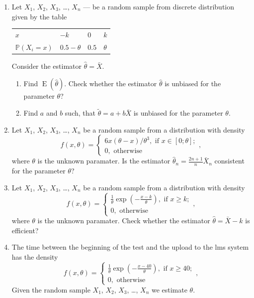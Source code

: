 \documentclass[12pt]{article}
\DeclareMathOperator{\E}{E}
\def \P{\mathbb{P}}
\begin{document}
\begin{enumerate}

\item  Let $X_1$, $X_2$, $X_3$, \ldots, $X_n$ — be a random sample from 
discrete distribution given by the table

\begin{tabular}{@{}llll@{}}
  \toprule
   $x$           & $-k$ & $0$ & $k$ \\ 
   $\P(X_i = x)$ & $0.5-\theta$ & $0.5$ & $\theta$ \\
  \bottomrule
\end{tabular}
			
Consider the estimator $\hat \theta = \bar X$.
\begin{enumerate}
  \item Find $\E(\hat \theta)$. 
  Check whether the estimator $\hat \theta$ is unbiased for the parameter $\theta$?
  \item Find $a$ and $b$ such, 
  that $\tilde \theta = a + b\bar X$ is unbiased for the parameter $\theta$.
  \end{enumerate} 
  

\item Let $X_1$, $X_2$, $X_3$, \ldots, $X_n$ 
 be a random sample from a distribution with density
\[
f(x, \theta) = \begin{cases}
  6x(\theta - x)/\theta^3, \text{ if } x\in [0;\theta]; \\
  0, \text{ otherwise}
\end{cases},
\]
where $\theta$  is the unknown paramater. 
Is the estimator $\hat\theta_n = \frac{2n+1}{n}\bar X_n$ consistent for the parameter $\theta$?

\item Let $X_1$, $X_2$, $X_3$, \ldots, $X_n$  be a random sample from a distribution with density
\[
  f(x, \theta) = \begin{cases}
    \frac{1}{\theta}\exp\left(-\frac{x-k}{\theta}\right), \text{ if } x\geq k; \\
    0, \text{ otherwise}
  \end{cases},    
\]
where $\theta$  is the unknown paramater. 
Check whether the estimator $\hat\theta = \bar X - k$ is efficient?

\item  The time between the beginning of the test and the upload to the lms system
has the density
\[
  f(x, \theta) = \begin{cases}
    \frac{1}{\theta}\exp\left(-\frac{x-40}{\theta}\right), \text{ if } x\geq 40; \\
    0, \text{ otherwise}
  \end{cases},    
\]
Given the random sample $X_1$, $X_2$, $X_3$, \ldots, $X_n$ we estimate $\theta$. 


\end{enumerate}
\end{document}
